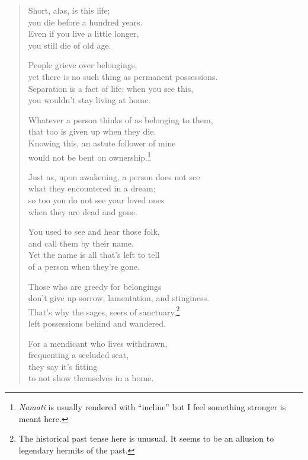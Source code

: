 \documentclass[12pt,openany]{book}%
\begin{document}
\begin{verse}%
Short, alas, is this life; \\
you die before a hundred years. \\
Even if you live a little longer, \\
you still die of old age. 

People grieve over belongings, \\
yet there is no such thing as permanent possessions. \\
Separation is a fact of life; when you see this, \\
you wouldn’t stay living at home. 

Whatever a person thinks of as belonging to them, \\
that too is given up when they die. \\
Knowing this, an astute follower of mine \\
would not be bent on ownership.\footnote{\textit{Namati} is usually rendered with “incline” but I feel something stronger is meant here. } 

Just as, upon awakening, a person does not see \\
what they encountered in a dream; \\
so too you do not see your loved ones \\
when they are dead and gone. 

You used to see and hear those folk, \\
and call them by their name. \\
Yet the name is all that’s left to tell \\
of a person when they’re gone. 

Those who are greedy for belongings \\
don’t give up sorrow, lamentation, and stinginess. \\
That’s why the sages, seers of sanctuary,\footnote{The historical past tense here is unusual. It seems to be an allusion to legendary hermits of the past. } \\
left possessions behind and wandered. 

For a mendicant who lives withdrawn, \\
frequenting a secluded seat, \\
they say it’s fitting \\
to not show themselves in a home. 


\end{verse}
\end{document}
